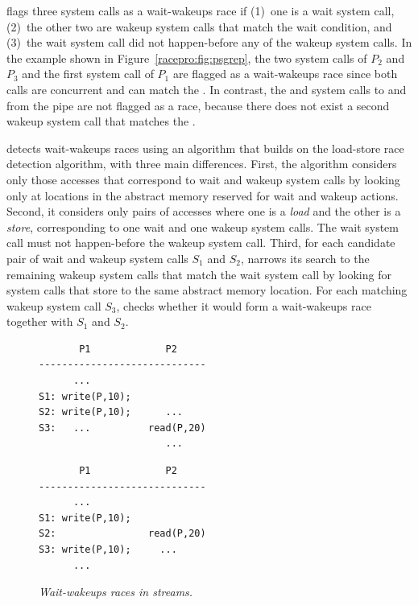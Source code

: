 \racepro flags three system calls as a wait-wakeups race if (1)~one is a
wait system call, (2)~the other two are wakeup system calls that match
the wait condition, and (3)~the wait system call did not happen-before
any of the wakeup system calls.
In the  example shown in Figure~\ref{racepro:fig:psgrep},
the two  system calls of $P_2$ and $P_3$ and the first
 system call of $P_1$ are flagged as a wait-wakeups race since
both  calls are concurrent and can match the .  In
contrast, the  and  system calls to and from the pipe
are not flagged as a race, because there does not exist a second
wakeup system call that matches the . 

\racepro detects wait-wakeups races using an algorithm that builds on the
load-store race detection algorithm, with three main differences. First,
the algorithm considers only those accesses that correspond to wait and
wakeup system calls by looking only at locations in the abstract
memory reserved for wait and wakeup actions.  Second, it considers
only pairs of accesses where one is a \emph{load} and the other is a
\emph{store},
corresponding to one wait and one wakeup system calls. The wait system
call must not happen-before the wakeup system call. Third, for each
candidate pair of wait and wakeup system calls $S_1$ and $S_2$, \racepro
narrows its search to the remaining wakeup system calls that match the
wait system call by looking for system calls that store to the same
abstract memory location.  For each matching wakeup system call $S_3$,
\racepro checks whether it would form a wait-wakeups race together with
$S_1$ and $S_2$. 

\begin{figure}[t]
\begin{minipage}[b]{.40\linewidth}
\begin{footnotesize}
\begin{verbatim}
       P1             P2
-----------------------------
      ...
S1: write(P,10);
S2: write(P,10);      ...
S3:   ...          read(P,20)
                      ...
\end{verbatim}
\end{footnotesize}
\vspace{-5mm}
\end{minipage}
\hskip 1cm
\begin{minipage}[b]{.45\linewidth}
\begin{footnotesize}
\begin{verbatim}
       P1             P2
-----------------------------
      ...
S1: write(P,10);
S2:                read(P,20)
S3: write(P,10);     ...
      ...
\end{verbatim}
\end{footnotesize}
\vspace{-5mm}
\end{minipage}
\vspace{-1mm}
\caption{{\em Wait-wakeups races in streams.}} \label{racepro:fig:streams}
\vspace{-1mm}
\end{figure}

